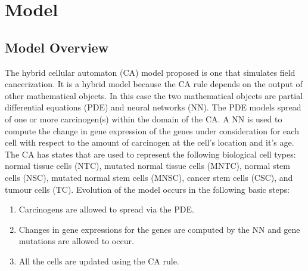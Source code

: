 \documentclass[\main/thesis.tex]{subfiles}
\begin{document}
\chapter{Model}

\section{Model Overview}
The hybrid cellular automaton (CA) model proposed is one that simulates field cancerization. It is a hybrid model because the CA rule depends on the output of other mathematical objects. 
In this case the two mathematical objects are partial differential equations (PDE) and neural networks (NN). The PDE models spread of one or more carcinogen(s) within the domain of the CA.
A NN is used to compute the change in gene expression of the genes under consideration for each cell with respect to the amount of carcinogen at the cell's location and it's age. 
The CA has states that are used to represent the following biological cell types: normal tissue cells (NTC), mutated normal tissue cells (MNTC), normal stem cells (NSC), mutated normal stem cells (MNSC), 
cancer stem cells (CSC), and tumour cells (TC).
Evolution of the model occurs in the following basic steps:
\begin{enumerate}
	\item Carcinogens are allowed to spread via the PDE.
	\item Changes in gene expressions for the genes are computed by the NN and gene mutations are allowed to occur. 
	\item All the cells are updated using the CA rule. 
\end{enumerate}
\end{document}
